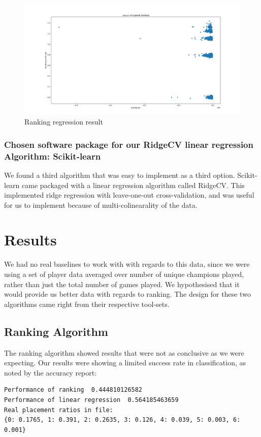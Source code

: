 \documentclass{article} %
\begin{document}
\begin{figure}[h!]
\centering
\includegraphics[scale=0.35]{ranking_regression.PNG}
\caption{Ranking regression result}
\label{fig:ranking}
\end{figure}

\subsubsection{Chosen software package for our RidgeCV linear regression Algorithm: Scikit-learn}
We found a third algorithm that was easy to implement as a third option. Scikit-learn came packaged with a linear regression algorithm called RidgeCV. This implemented ridge regression with leave-one-out cross-validation, and was useful for us to implement because of multi-colinearality of the data.

\section{Results}
We had no real baselines to work with with regards to this data, since we were using a set of player data averaged over number of unique champions played, rather than just the total number of games played. We hypothesised that it would provide us better data with regards to ranking. The design for these two algorithms came right from their respective tool-sets.

\subsection{Ranking Algorithm}
The ranking algorithm showed results that were not as conclusive as we were expecting. Our results were showing a limited success rate in classification, as noted by the accuracy report:
\begin{lstlisting}
Performance of ranking  0.444810126582
Performance of linear regression  0.564185463659
Real placement ratios in file:
{0: 0.1765, 1: 0.391, 2: 0.2635, 3: 0.126, 4: 0.039, 5: 0.003, 6: 0.001}
\end{lstlisting}
\end{document}
